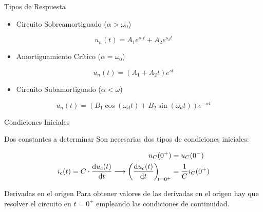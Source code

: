 \documentclass[aspectratio=169, usenames,svgnames,dvipsnames]{beamer}
\begin{document}
\begin{frame}[label={sec:org2d32702}]{Tipos de Respuesta}
\begin{itemize}
\item Circuito Sobreamortiguado (\(\alpha > \omega_0\))
\end{itemize}
\[
  \boxed{u_n(t) = A_1 e^{s_1 t} + A_2 e^{s_2 t}}
\]
\begin{itemize}
\item Amortiguamiento Crítico (\(\alpha = \omega_0\))
\end{itemize}
\[
  \boxed{u_n(t) = (A_1 + A_2 t) e^{s t} }
\]

\begin{itemize}
\item Circuito Subamortiguado (\(\alpha < \omega\))
\end{itemize}
\[
  \boxed{u_n(t) = (B_1\cos(\omega_d t) + B_2\sin(\omega_d t)) e^{-\alpha t}}
\]
\end{frame}


\begin{frame}[label={sec:org50bcb70}]{Condiciones Iniciales}
\begin{block}{Dos constantes a determinar}
Son necesarias dos tipos de condiciones iniciales:


\begin{align*}
  u_C(0^+) &= u_C(0^-)\\
  i_c(t) = C \cdot \diff{u_c(t)}{t} \longrightarrow \diff{u_c(t)}{t}[t = 0^+] &= \frac{1}{C}i_C(0^+)
\end{align*}
\end{block}

\begin{block}{Derivadas en el origen}
Para obtener valores de las derivadas en el origen hay que resolver el circuito en \(t = 0^+\) empleando las condiciones de continuidad.
\end{block}
\end{frame}
\end{document}
